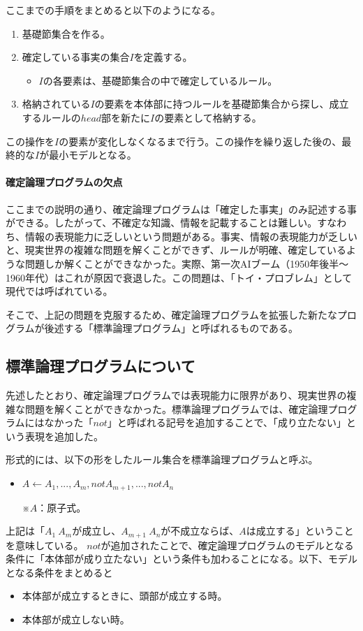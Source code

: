 \documentclass[dvipdfmx]{jsarticle}
\begin{document}
  ここまでの手順をまとめると以下のようになる。
  \begin{enumerate}
    \item 基礎節集合を作る。
    \item 確定している事実の集合$I$を定義する。
    \begin{itemize}
      \item $I$の各要素は、基礎節集合の中で確定しているルール。
    \end{itemize}
    \item 格納されている$I$の要素を本体部に持つルールを基礎節集合から探し、成立するルールの$head$部を新たに$I$の要素として格納する。
  \end{enumerate}
  この操作を$I$の要素が変化しなくなるまで行う。この操作を繰り返した後の、最終的な$I$が最小モデルとなる。
  \paragraph{確定論理プログラムの欠点}
  ここまでの説明の通り、確定論理プログラムは「確定した事実」のみ記述する事ができる。したがって、不確定な知識、情報を記載することは難しい。すなわち、情報の表現能力に乏しいという問題がある。事実、情報の表現能力が乏しいと、現実世界の複雑な問題を解くことができず、ルールが明確、確定しているような問題しか解くことができなかった。実際、第一次AIブーム（1950年後半〜1960年代）はこれが原因で衰退した。この問題は、「トイ・プロブレム」として現代では呼ばれている。\par
  そこで、上記の問題を克服するため、確定論理プログラムを拡張した新たなプログラムが後述する「標準論理プログラム」と呼ばれるものである。
\subsection{標準論理プログラムについて}
先述したとおり、確定論理プログラムでは表現能力に限界があり、現実世界の複雑な問題を解くことができなかった。標準論理プログラムでは、確定論理プログラムにはなかった「$not$」と呼ばれる記号を追加することで、「成り立たない」という表現を追加した。\par
形式的には、以下の形をしたルール集合を標準論理プログラムと呼ぶ。
\begin{itemize}
  \item $A \leftarrow A_{1}, ..., A_{m}, not A_{m+1}, ..., not A_{n}$\par
  ※$A$：原子式。
\end{itemize}
上記は「$A_{1}~A_{m}$が成立し、$A_{m+1}~A_{n}$が不成立ならば、$A$は成立する」ということを意味している。
$not$が追加されたことで、確定論理プログラムのモデルとなる条件に「本体部が成り立たない」という条件も加わることになる。以下、モデルとなる条件をまとめると
\begin{itemize}
  \item 本体部が成立するときに、頭部が成立する時。
  \item 本体部が成立しない時。
\end{itemize}
\end{document}
